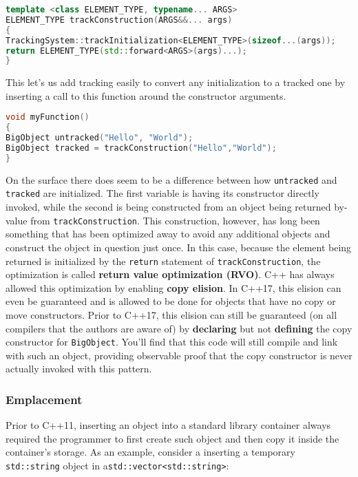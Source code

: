 \begin{lstlisting}[language=C++]
template <class ELEMENT_TYPE, typename... ARGS>
ELEMENT_TYPE trackConstruction(ARGS&&... args)
{
TrackingSystem::trackInitialization<ELEMENT_TYPE>(sizeof...(args));
return ELEMENT_TYPE(std::forward<ARGS>(args)...);
}
\end{lstlisting}

\noindent This let's us add tracking easily to convert any initialization to a
tracked one by inserting a call to this function around the constructor
arguments.

\begin{lstlisting}[language=C++]
void myFunction()
{
BigObject untracked("Hello", "World");
BigObject tracked = trackConstruction("Hello","World");
}
\end{lstlisting}

\noindent On the surface there does seem to be a difference between how
\texttt{untracked} and \texttt{tracked} are initialized. The first
variable is having its constructor directly invoked, while the second is
being constructed from an object being returned by-value from
\texttt{trackConstruction}. This construction, however, has long been
something that has been optimized away to avoid any additional objects
and construct the object in question just once. In this case, because
the element being returned is initialized by the \texttt{return}
statement of \texttt{trackConstruction}, the optimization is called
\textbf{return value optimization (RVO)}. C++ has always
allowed this optimization by enabling \textbf{copy elision}. In C++17,
this elision can even be guaranteed and is allowed to be done for
objects that have no copy or move constructors. Prior to C++17, this
elision can still be guaranteed (on all compilers that the authors are
aware of) by \textbf{declaring} but not \textbf{defining} the copy
constructor for \texttt{BigObject}. You'll find that this code will
still compile and link with such an object, providing observable proof
that the copy constructor is never actually invoked with this pattern.

\subsubsection[Emplacement]{Emplacement}\label{emplacement}

Prior to C++11, inserting an object into a standard library container
always required the programmer to first create such object and then
copy it inside the container's storage. As an example, consider a
inserting a temporary \texttt{std::string} object in a\linebreak[4]
\mbox{\texttt{std::vector<std::string>}}:

